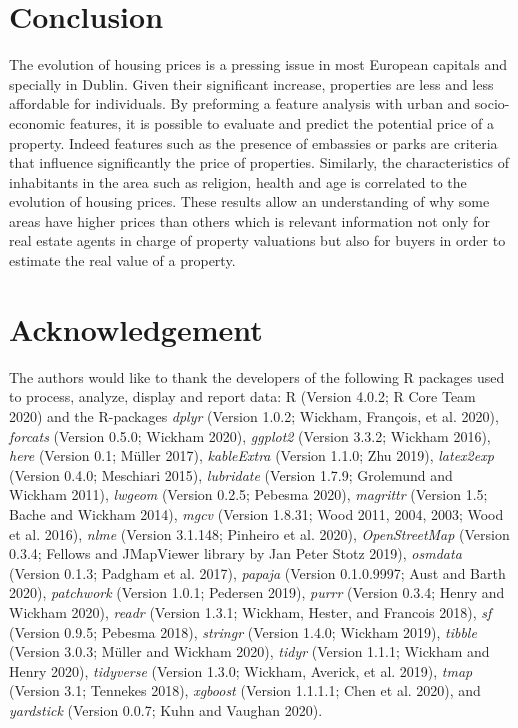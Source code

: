 \documentclass[conference,final,]{IEEEtran}
\begin{document}
\hypertarget{conclusion}{%
\section{Conclusion}\label{conclusion}}

The evolution of housing prices is a pressing issue in most European capitals and specially in Dublin. Given their significant increase, properties are less and less affordable for individuals. By preforming a feature analysis with urban and socio-economic features, it is possible to evaluate and predict the potential price of a property. Indeed features such as the presence of embassies or parks are criteria that influence significantly the price of properties. Similarly, the characteristics of inhabitants in the area such as religion, health and age is correlated to the evolution of housing prices. These results allow an understanding of why some areas have higher prices than others which is relevant information not only for real estate agents in charge of property valuations but also for buyers in order to estimate the real value of a property.

\hypertarget{acknowledgement}{%
\section{Acknowledgement}\label{acknowledgement}}

The authors would like to thank the developers of the following R packages used to process, analyze, display and report data: R (Version 4.0.2; R Core Team 2020) and the R-packages \emph{dplyr} (Version 1.0.2; Wickham, François, et al. 2020), \emph{forcats} (Version 0.5.0; Wickham 2020), \emph{ggplot2} (Version 3.3.2; Wickham 2016), \emph{here} (Version 0.1; Müller 2017), \emph{kableExtra} (Version 1.1.0; Zhu 2019), \emph{latex2exp} (Version 0.4.0; Meschiari 2015), \emph{lubridate} (Version 1.7.9; Grolemund and Wickham 2011), \emph{lwgeom} (Version 0.2.5; Pebesma 2020), \emph{magrittr} (Version 1.5; Bache and Wickham 2014), \emph{mgcv} (Version 1.8.31; Wood 2011, 2004, 2003; Wood et al. 2016), \emph{nlme} (Version 3.1.148; Pinheiro et al. 2020), \emph{OpenStreetMap} (Version 0.3.4; Fellows and JMapViewer library by Jan Peter Stotz 2019), \emph{osmdata} (Version 0.1.3; Padgham et al. 2017), \emph{papaja} (Version 0.1.0.9997; Aust and Barth 2020), \emph{patchwork} (Version 1.0.1; Pedersen 2019), \emph{purrr} (Version 0.3.4; Henry and Wickham 2020), \emph{readr} (Version 1.3.1; Wickham, Hester, and Francois 2018), \emph{sf} (Version 0.9.5; Pebesma 2018), \emph{stringr} (Version 1.4.0; Wickham 2019), \emph{tibble} (Version 3.0.3; Müller and Wickham 2020), \emph{tidyr} (Version 1.1.1; Wickham and Henry 2020), \emph{tidyverse} (Version 1.3.0; Wickham, Averick, et al. 2019), \emph{tmap} (Version 3.1; Tennekes 2018), \emph{xgboost} (Version 1.1.1.1; Chen et al. 2020), and \emph{yardstick} (Version 0.0.7; Kuhn and Vaughan 2020).
\end{document}
